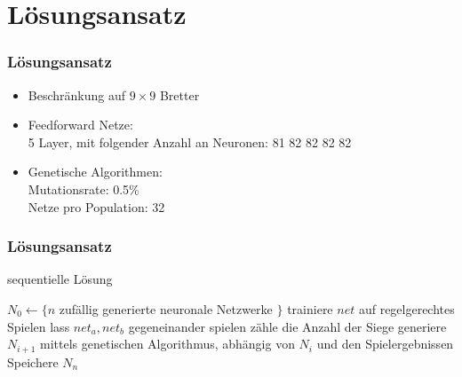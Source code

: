 \section{Lösungsansatz}

\begin{frame}
    \frametitle{Lösungsansatz}

    \begin{itemize}
        \item Beschränkung auf $9 \times 9$ Bretter
        \item Feedforward Netze:\\
            5 Layer, mit folgender Anzahl an Neuronen: 81 82 82 82 82
        \item Genetische Algorithmen:\\
            Mutationsrate: 0.5\%\\
            Netze pro Population: 32\\
    \end{itemize}
\end{frame}

\begin{frame}
    \frametitle{Lösungsansatz}

    \begin{algorithm}[H]
        \caption{sequentielle Lösung}
        \begin{algorithmic}[1]
            \State $N_0 \gets \{ n$ zufällig generierte neuronale Netzwerke $\}$
                \State trainiere $net$ auf regelgerechtes Spielen
            \EndFor
                    \State lass $net_a, net_b$ gegeneinander spielen
                    \State zähle die Anzahl der Siege
                \EndFor
                \State generiere $N_{i+1}$ mittels genetischen Algorithmus,
                abhängig von $N_i$ und den Spielergebnissen
            \EndFor
            \State Speichere $N_n$
        \end{algorithmic}
    \end{algorithm}
\end{frame}

